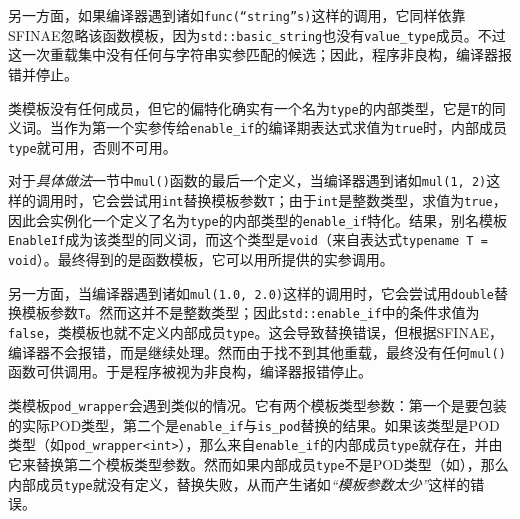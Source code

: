 
另一方面，如果编译器遇到诸如\texttt{func(\allowbreak{}“string”s)}这样的调用，它同样依靠SFINAE忽略该函数模板，因为\texttt{std::\allowbreak{}basic\_\allowbreak{}string}也没有\texttt{value\_\allowbreak{}type}成员。不过这一次重载集中没有任何与字符串实参匹配的候选；因此，程序非良构，编译器报错并停止。



类模板没有任何成员，但它的偏特化确实有一个名为\texttt{type}的内部类型，它是\texttt{T}的同义词。当作为第一个实参传给\texttt{enable\_\allowbreak{}if}的编译期表达式求值为\texttt{true}时，内部成员\texttt{type}就可用，否则不可用。



对于\textit{具体做法}一节中\texttt{mul()}函数的最后一个定义，当编译器遇到诸如\texttt{mul(\allowbreak{}1, 2)}这样的调用时，它会尝试用\texttt{int}替换模板参数\texttt{T}；由于\texttt{int}是整数类型，求值为\texttt{true}，因此会实例化一个定义了名为\texttt{type}的内部类型的\texttt{enable\_\allowbreak{}if}特化。结果，别名模板\texttt{EnableIf}成为该类型的同义词，而这个类型是\texttt{void}（来自表达式\texttt{typename T = void}）。最终得到的是函数模板，它可以用所提供的实参调用。



另一方面，当编译器遇到诸如\texttt{mul(\allowbreak{}1.\allowbreak{}0, 2.\allowbreak{}0)}这样的调用时，它会尝试用\texttt{double}替换模板参数\texttt{T}。然而这并不是整数类型；因此\texttt{std::\allowbreak{}enable\_\allowbreak{}if}中的条件求值为\texttt{false}，类模板也就不定义内部成员\texttt{type}。这会导致替换错误，但根据SFINAE，编译器不会报错，而是继续处理。然而由于找不到其他重载，最终没有任何\texttt{mul()}函数可供调用。于是程序被视为非良构，编译器报错停止。



类模板\texttt{pod\_\allowbreak{}wrapper}会遇到类似的情况。它有两个模板类型参数：第一个是要包装的实际POD类型，第二个是\texttt{enable\_\allowbreak{}if}与\texttt{is\_\allowbreak{}pod}替换的结果。如果该类型是POD类型（如\texttt{pod\_\allowbreak{}wrapper<\allowbreak{}int>}），那么来自\texttt{enable\_\allowbreak{}if}的内部成员\texttt{type}就存在，并由它来替换第二个模板类型参数。然而如果内部成员\texttt{type}不是POD类型（如），那么内部成员\texttt{type}就没有定义，替换失败，从而产生诸如\textit{“模板参数太少”}这样的错误。


